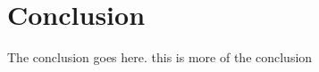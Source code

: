 \documentclass[10pt, conference, compsocconf]{IEEEtran}
\theoremstyle{plain}
\theoremstyle{definition}
\begin{document}



\section{Conclusion}
The conclusion goes here. this is more of the conclusion







%
%






\end{document}
